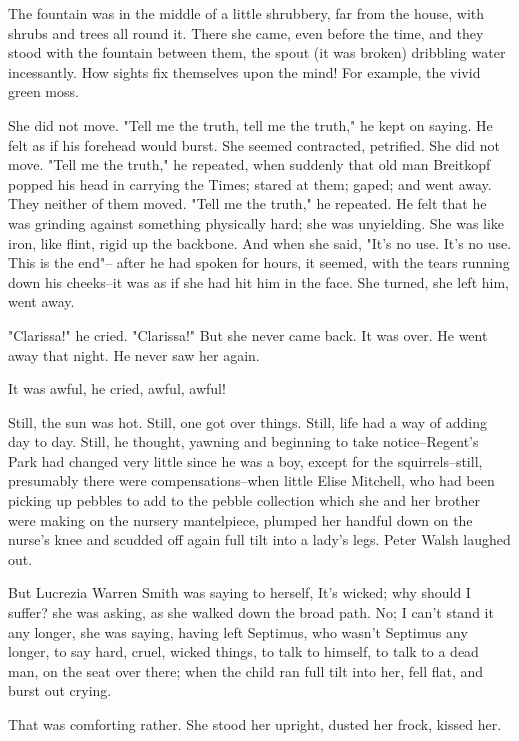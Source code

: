 \documentclass[lang=cn,10pt]{elegantbook}
\begin{document}
The fountain was in the middle of a little shrubbery, far from the
house, with shrubs and trees all round it.  There she came, even
before the time, and they stood with the fountain between them, the
spout (it was broken) dribbling water incessantly.  How sights fix
themselves upon the mind!  For example, the vivid green moss.

She did not move.  "Tell me the truth, tell me the truth," he kept
on saying.  He felt as if his forehead would burst.  She seemed
contracted, petrified.  She did not move.  "Tell me the truth," he
repeated, when suddenly that old man Breitkopf popped his head in
carrying the Times; stared at them; gaped; and went away.  They
neither of them moved.  "Tell me the truth," he repeated.  He felt
that he was grinding against something physically hard; she was
unyielding.  She was like iron, like flint, rigid up the backbone.
And when she said, "It's no use.  It's no use.  This is the end"--
after he had spoken for hours, it seemed, with the tears running
down his cheeks--it was as if she had hit him in the face.  She
turned, she left him, went away.

"Clarissa!" he cried.  "Clarissa!"  But she never came back.  It
was over.  He went away that night.  He never saw her again.



It was awful, he cried, awful, awful!

Still, the sun was hot.  Still, one got over things.  Still, life
had a way of adding day to day.  Still, he thought, yawning and
beginning to take notice--Regent's Park had changed very little
since he was a boy, except for the squirrels--still, presumably
there were compensations--when little Elise Mitchell, who had been
picking up pebbles to add to the pebble collection which she and
her brother were making on the nursery mantelpiece, plumped her
handful down on the nurse's knee and scudded off again full tilt
into a lady's legs.  Peter Walsh laughed out.

But Lucrezia Warren Smith was saying to herself, It's wicked; why
should I suffer? she was asking, as she walked down the broad path.
No; I can't stand it any longer, she was saying, having left
Septimus, who wasn't Septimus any longer, to say hard, cruel,
wicked things, to talk to himself, to talk to a dead man, on the
seat over there; when the child ran full tilt into her, fell flat,
and burst out crying.

That was comforting rather.  She stood her upright, dusted her
frock, kissed her.
\end{document}
